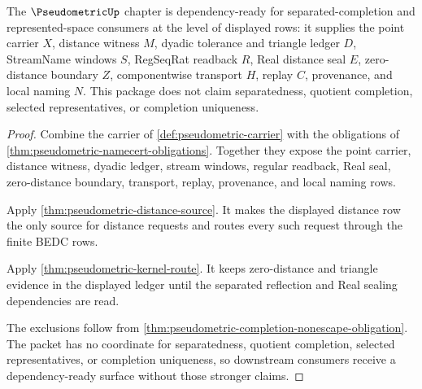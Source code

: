\begin{theorem}
\label{thm:pseudometric-deps-ready-package}
The $\PseudometricUp$ chapter is dependency-ready for separated-completion and represented-space consumers at the level of displayed rows: it supplies the point carrier $X$, distance witness $M$, dyadic tolerance and triangle ledger $D$, StreamName windows $S$, RegSeqRat readback $R$, Real distance seal $E$, zero-distance boundary $Z$, componentwise transport $H$, replay $C$, provenance, and local naming $N$. This package does not claim separatedness, quotient completion, selected representatives, or completion uniqueness.
\end{theorem}
\begin{proof}
Combine the carrier of \autoref{def:pseudometric-carrier} with the obligations of \autoref{thm:pseudometric-namecert-obligations}. Together they expose the point carrier, distance witness, dyadic ledger, stream windows, regular readback, Real seal, zero-distance boundary, transport, replay, provenance, and local naming rows.

Apply \autoref{thm:pseudometric-distance-source}. It makes the displayed distance row the only source for distance requests and routes every such request through the finite BEDC rows.

Apply \autoref{thm:pseudometric-kernel-route}. It keeps zero-distance and triangle evidence in the displayed ledger until the separated reflection and Real sealing dependencies are read.

The exclusions follow from \autoref{thm:pseudometric-completion-nonescape-obligation}. The packet has no coordinate for separatedness, quotient completion, selected representatives, or completion uniqueness, so downstream consumers receive a dependency-ready surface without those stronger claims.
\end{proof}

